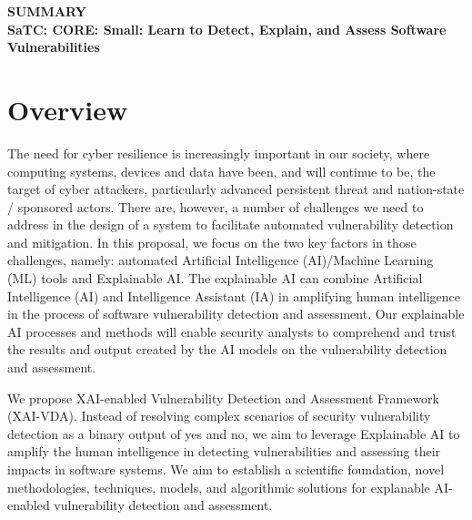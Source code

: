 \documentclass[11pt]{article}
\begin{document}


\begin{center}
  {\bf SUMMARY\\ SaTC: CORE: Small: Learn to Detect, Explain, and Assess Software Vulnerabilities}
\end{center}


\vspace{-12pt}
\section{Overview}

The need for cyber resilience is increasingly important in our
society, where computing systems, devices and data have been, and will
continue to be, the target of cyber attackers, particularly advanced
persistent threat and nation-state / sponsored actors. There are,
however, a number of challenges we need to address in the design of a
system to facilitate automated vulnerability detection and
mitigation. In this proposal, we focus on the two key factors in
those challenges, namely: automated Artificial Intelligence
(AI)/Machine Learning (ML) tools and Explainable AI. The explainable
AI can combine Artificial Intelligence (AI) and Intelligence Assistant
(IA) in amplifying human intelligence in the process of software
vulnerability detection and assessment. Our explainable AI processes
and methods will enable security analysts to comprehend and trust the
results and output created by the AI models on the vulnerability
detection and assessment.


We propose XAI-enabled Vulnerability Detection and Assessment
Framework (XAI-VDA). Instead of resolving complex scenarios of
security vulnerability detection as a binary output of yes and no, we
aim to leverage Explainable AI to amplify the human intelligence in
detecting vulnerabilities and assessing their impacts in software
systems. We aim to establish a scientific foundation, novel
methodologies, techniques, models, and algorithmic solutions for
explanable AI-enabled vulnerability detection and assessment.
\end{document}
